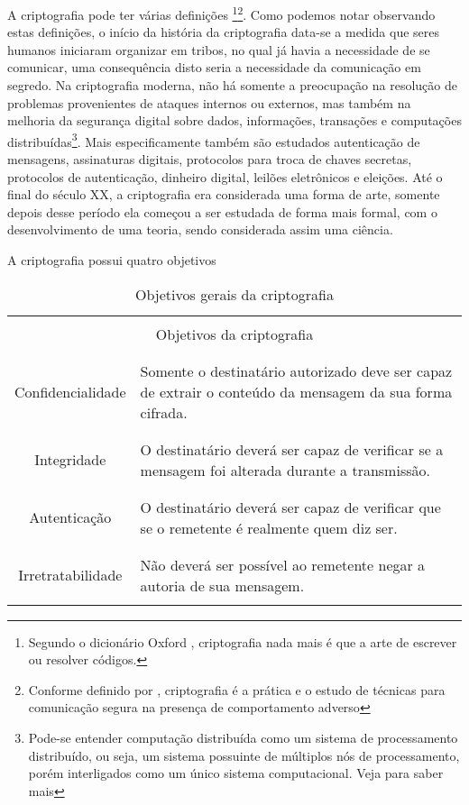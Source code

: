   A criptografia  pode ter várias definições \footnote{Segundo o dicionário Oxford \cite{OXDIC}, criptografia nada mais é que a arte de escrever ou resolver códigos.}\footnote{Conforme definido por \cite{RIVEST}, criptografia é a prática e o estudo de técnicas para comunicação segura na presença de comportamento adverso}. Como podemos notar observando estas definições, o início da história da criptografia data-se a medida que seres humanos iniciaram organizar em tribos, no qual já havia a necessidade de se comunicar, uma consequência disto seria a necessidade da comunicação em segredo. Na criptografia moderna, não há somente a preocupação na resolução de problemas provenientes de ataques internos ou externos, mas também na melhoria da segurança digital sobre dados, informações, transações e computações distribuídas\footnote{Pode-se entender computação distribuída como um sistema de processamento distribuído, ou seja, um sistema possuinte de múltiplos nós de processamento, porém interligados como um único sistema computacional. Veja \cite{PROG2} para saber mais}. Mais especificamente também são estudados autenticação de mensagens, assinaturas digitais, protocolos para troca de chaves secretas, protocolos de autenticação, dinheiro digital, leilões eletrônicos e eleições.  Até o final do século XX, a criptografia era considerada uma forma de arte, somente depois desse período ela começou a ser estudada de forma mais formal, com o desenvolvimento de uma teoria, sendo considerada assim uma ciência.
  
  
  A criptografia possui quatro objetivos
  \begin{table}
  \centering
  \begin{tabular}{|c|p{12cm}|}
  	\hline
  	\multicolumn{2}{|c|}{}\\
  	\multicolumn{2}{|c|}{Objetivos da criptografia} \\
  	\multicolumn{2}{|c|}{}\\
  	\hline
  	&\\
  	Confidencialidade & Somente o destinatário autorizado deve ser capaz de extrair o conteúdo da mensagem da sua forma cifrada. \\
  	&\\
  	\hline
  	&\\
  	Integridade & O destinatário deverá ser capaz de verificar se a mensagem foi alterada durante a transmissão. \\
  	&\\
  	\hline
  	&\\
  	Autenticação & O destinatário deverá ser capaz de verificar que se o remetente é realmente quem diz ser. \\
  	&\\
  	\hline
  	&\\
  	Irretratabilidade & Não deverá ser possível ao remetente negar a autoria de sua mensagem. \\
  	&\\
  	\hline
  \end{tabular}
\caption{Objetivos gerais da criptografia}
\end{table}
  
